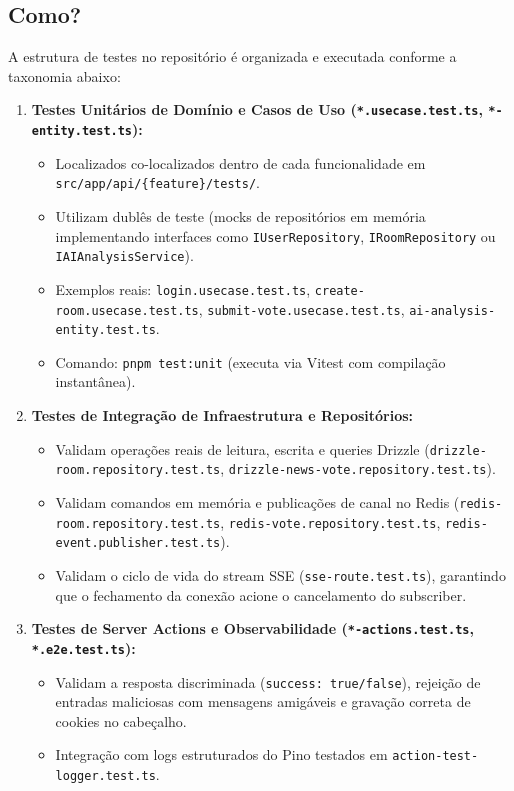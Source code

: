 \documentclass[12pt,a4paper]{article}
\begin{document}
\subsection{Como?}
A estrutura de testes no repositório é organizada e executada conforme a taxonomia abaixo:
\begin{enumerate}
  \item \textbf{Testes Unitários de Domínio e Casos de Uso (\texttt{*.usecase.test.ts}, \texttt{*-entity.test.ts}):}
  \begin{itemize}
    \item Localizados co-localizados dentro de cada funcionalidade em \texttt{src/app/api/\{feature\}/tests/}.
    \item Utilizam dublês de teste (mocks de repositórios em memória implementando interfaces como \texttt{IUserRepository}, \texttt{IRoomRepository} ou \texttt{IAIAnalysisService}).
    \item Exemplos reais: \texttt{login.usecase.test.ts}, \texttt{create-room.usecase.test.ts}, \texttt{submit-vote.usecase.test.ts}, \texttt{ai-analysis-entity.test.ts}.
    \item Comando: \texttt{pnpm test:unit} (executa via Vitest com compilação instantânea).
  \end{itemize}
  \item \textbf{Testes de Integração de Infraestrutura e Repositórios:}
  \begin{itemize}
    \item Validam operações reais de leitura, escrita e queries Drizzle (\texttt{drizzle-room.repository.test.ts}, \texttt{drizzle-news-vote.repository.test.ts}).
    \item Validam comandos em memória e publicações de canal no Redis (\texttt{redis-room.repository.test.ts}, \texttt{redis-vote.repository.test.ts}, \texttt{redis-event.publisher.test.ts}).
    \item Validam o ciclo de vida do stream SSE (\texttt{sse-route.test.ts}), garantindo que o fechamento da conexão acione o cancelamento do subscriber.
  \end{itemize}
  \item \textbf{Testes de Server Actions e Observabilidade (\texttt{*-actions.test.ts}, \texttt{*.e2e.test.ts}):}
  \begin{itemize}
    \item Validam a resposta discriminada (\texttt{success: true/false}), rejeição de entradas maliciosas com mensagens amigáveis e gravação correta de cookies no cabeçalho.
    \item Integração com logs estruturados do Pino testados em \texttt{action-test-logger.test.ts}.

\end{itemize}
\end{enumerate}
\end{document}
